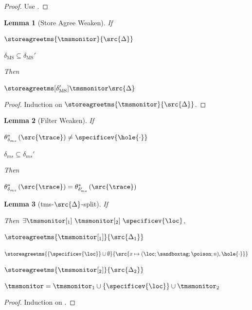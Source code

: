 \documentclass[a4paper,names,dvipsnames]{article}
\newtheorem{lemma}{Lemma}
\begin{document}
\begin{proof}
  Use .
\end{proof}

\begin{lemma}[Store Agree Weaken]\label{lem:store-agree-weaken}
  If
  \begin{assumptions}
    \item $\storeagreetms{\tmsmonitor}{\src{\Delta}}$
    \item $\delta_{\text{MS}}\subseteq\delta_{\text{MS}}'$
  \end{assumptions}
  Then
  \begin{goals}
    \item $\storeagreetms[\delta_{\text{MS}}']{\tmsmonitor}{\src{\Delta}}$
  \end{goals}
\end{lemma}
\begin{proof}
  Induction on $\storeagreetms{\tmsmonitor}{\src{\Delta}}$.
\end{proof}

\begin{lemma}[Filter Weaken]\label{lem:filter-weaken}
  If
  \begin{assumptions}
    \item $\theta_{\delta_{ms}}^{*}\left(\src{\trace}\right) \not=\specificev{\hole{\cdot}}$
    \item $\delta_{ms}\subseteq\delta_{ms}'$
  \end{assumptions}
  Then
  \begin{goals}
    \item $\theta_{\delta_{ms}}^{*}\left(\src{\trace}\right) = \theta_{\delta_{ms}'}^{*}\left(\src{\trace}\right)$
  \end{goals}
\end{lemma}

\begin{lemma}[\gls{tms}-$\src{\Delta}$-split]\label{lem:tms:store:split}
  If
  Then $\exists \tmsmonitor[_{1}]\ \tmsmonitor[_{2}]\ \specificev{\loc}$,
  \begin{goals}
    \item $\storeagreetms{\tmsmonitor[_{1}]}{\src{\Delta_{1}}}$
    \item $\storeagreetms{\{\specificev{\loc}\}\cup\emptyset}{\src{x\mapsto(\loc;\sandboxtag;\poison;n),\hole{\cdot}}}$
    \item $\storeagreetms{\tmsmonitor[_{2}]}{\src{\Delta_{2}}}$
    \item $\tmsmonitor=\tmsmonitor_{1}\cup\{\specificev{\loc}\}\cup\tmsmonitor_{2}$
  \end{goals}
\end{lemma}
\begin{proof}
  Induction on .
\end{proof}
\end{document}
